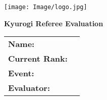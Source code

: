 \documentclass[10pt]{article}
\begin{document}
\begin{minipage}{0.2\textwidth}
    \texttt{[image: Image/logo.jpg]}
\end{minipage}
\begin{minipage}{0.75\textwidth}
    \begin{center}
        \textbf{\Huge Kyurogi Referee Evaluation}
    \end{center}
    
    \begin{tabular}{p{} p{}}
        \textbf{Name:} & \hrulefill \\
        \textbf{Current Rank:} & \hrulefill \\
        \textbf{Event:} & \hrulefill \\
        \textbf{Evaluator:} & \hrulefill \\
    \end{tabular}
\end{minipage}
\end{document}
